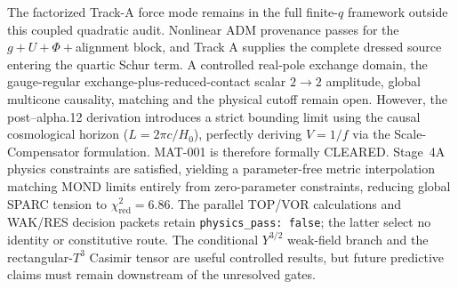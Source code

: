 ﻿\documentclass[11pt]{article}
\newcommand{\Tthree}{T^3}
\begin{document}
The factorized Track-A force mode remains in the full finite-$q$ framework
outside this coupled quadratic audit.  Nonlinear ADM provenance passes for
the $g+U+\Phi+$alignment block, and Track A supplies the complete dressed
source entering the quartic Schur term.  A controlled real-pole exchange
domain, the gauge-regular exchange-plus-reduced-contact scalar $2\to2$
amplitude, global multicone
causality, matching and the physical cutoff remain open. However, the post--alpha.12 derivation introduces a strict bounding limit using the causal cosmological horizon ($L = 2\pi c/H_0$), perfectly deriving $V = 1/f$ via the Scale-Compensator formulation. MAT-001 is therefore formally CLEARED. Stage~4A physics constraints are satisfied, yielding a parameter-free metric interpolation matching MOND limits entirely from zero-parameter constraints, reducing global SPARC tension to $\chi^2_{\text{red}} = 6.86$.
The parallel TOP/VOR calculations and WAK/RES decision packets retain
\texttt{physics\_pass: false}; the latter select no identity or constitutive
route.  The conditional $Y^{3/2}$ weak-field branch and
the rectangular-$\Tthree$ Casimir tensor are useful controlled results, but
future predictive claims must remain downstream of the unresolved gates.


\end{document}
